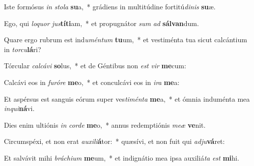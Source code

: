 \item Iste formósus \textit{in} \textit{sto}\textit{la} \textbf{su}a,~* grádiens in multitúdine fortitú\textit{di}\textit{nis} \textbf{su}æ.
\item Ego, qui \textit{lo}\textit{quor} \textit{jus}\textbf{tí}\textbf{ti}am,~* et propugnátor \textit{sum} \textit{ad} \textbf{sál}\textbf{van}dum.
\item Quare ergo rubrum est ind\textit{u}\textit{mén}\textit{tum} \textbf{tu}um,~* et vestiménta tua sicut calcántium in \textit{tor}\textit{cu}\textbf{lá}ri?
\item Tórcular \textit{cal}\textit{cá}\textit{vi} \textbf{so}lus,~* et de Géntibus non \textit{est} \textit{vir} \textbf{me}cum:
\item Calcávi eos in \textit{fu}\textit{ró}\textit{re} \textbf{me}o,~* et conculcávi eos in \textit{i}\textit{ra} \textbf{me}a:
\item Et aspérsus est sanguis eórum super ves\textit{ti}\textit{mén}\textit{ta} \textbf{me}a,~* et ómnia induménta mea \textit{in}\textit{qui}\textbf{ná}vi.
\item Dies enim ultiónis \textit{in} \textit{cor}\textit{de} \textbf{me}o,~* annus redemptiónis \textit{me}\textit{æ} \textbf{ve}nit.
\item Circumspéxi, et non erat \textit{au}\textit{xi}\textit{li}\textbf{á}tor:~* quæsívi, et non fuit qui \textit{ad}\textit{ju}\textbf{vá}ret:
\item Et salvávit mihi \textit{brá}\textit{chi}\textit{um} \textbf{me}um,~* et indignátio mea ipsa auxiliá\textit{ta} \textit{est} \textbf{mi}hi.
